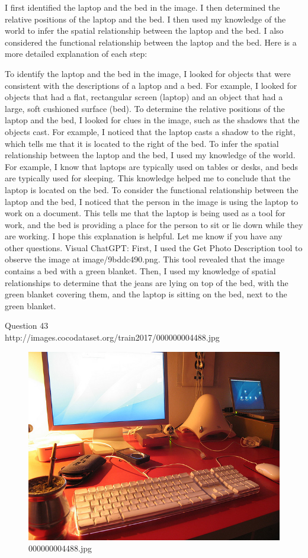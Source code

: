 \begin{enumerate}
    I first identified the laptop and the bed in the image.
    I then determined the relative positions of the laptop and the bed.
    I then used my knowledge of the world to infer the spatial relationship between the laptop and the bed.
    I also considered the functional relationship between the laptop and the bed.
    Here is a more detailed explanation of each step:
    
    To identify the laptop and the bed in the image, I looked for objects that were consistent with the descriptions of a laptop and a bed. For example, I looked for objects that had a flat, rectangular screen (laptop) and an object that had a large, soft cushioned surface (bed).
    To determine the relative positions of the laptop and the bed, I looked for clues in the image, such as the shadows that the objects cast. For example, I noticed that the laptop casts a shadow to the right, which tells me that it is located to the right of the bed.
    To infer the spatial relationship between the laptop and the bed, I used my knowledge of the world. For example, I know that laptops are typically used on tables or desks, and beds are typically used for sleeping. This knowledge helped me to conclude that the laptop is located on the bed.
    To consider the functional relationship between the laptop and the bed, I noticed that the person in the image is using the laptop to work on a document. This tells me that the laptop is being used as a tool for work, and the bed is providing a place for the person to sit or lie down while they are working.
    I hope this explanation is helpful. Let me know if you have any other questions.
    \subitem Visual ChatGPT: First, I used the Get Photo Description tool to observe the image at image/9bddc490.png. This tool revealed that the image contains a bed with a green blanket. Then, I used my knowledge of spatial relationships to determine that the jeans are lying on top of the bed, with the green blanket covering them, and the laptop is sitting on the bed, next to the green blanket.
\end{enumerate}
Question 43\\
http://images.cocodataset.org/train2017/000000004488.jpg
\begin{figure}[h]
    \centering
    \includegraphics[width=0.8\linewidth]{../image set/hard/000000004488.jpg}
    \caption{000000004488.jpg}
\end{figure}
